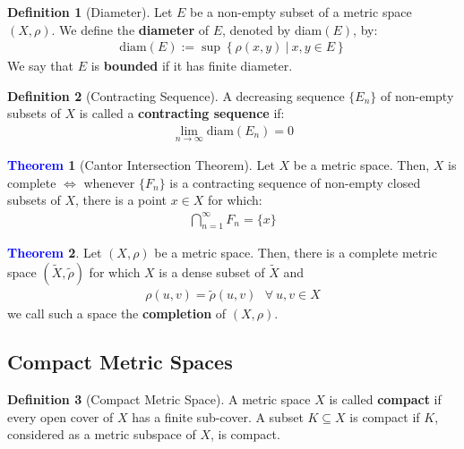 \documentclass[11pt]{article}
\theoremstyle{definition}
\theoremstyle{definition}
\newcommand{\sets}[2]{ \left\{ #1\ |\ #2 \right\}}
\newtheorem{theorem}{\textcolor{blue}{Theorem}}
\theoremstyle{definition}
\newtheorem{definition}{\textcolor{OliveGreen}{Definition}}
\theoremstyle{remark}
\begin{document}
\begin{definition}[Diameter]
	Let $E$ be a non-empty subset of a metric space $(X, \rho)$. We define the \textbf{diameter} of $E$, denoted by diam$(E)$, by: 
	\begin{align}
		\text{diam}(E):= \sup \sets{\rho(x,y)}{x, y \in E}
	\end{align}
	We say that $E$ is \textbf{bounded} if it has finite diameter. 
\end{definition}

\begin{definition}[Contracting Sequence]
	A decreasing sequence $\{ E_n \}$ of non-empty subsets of $X$ is called a \textbf{contracting sequence} if: 
	\begin{align}
		\lim_{n \rightarrow \infty} \text{diam}(E_n) = 0 
	\end{align}
\end{definition}

\begin{theorem}[Cantor Intersection Theorem]
	Let $X$ be a metric space. Then, $X$ is complete $\iff$ whenever $\{ F_n \}$ is a contracting sequence of non-empty closed subsets of $X$, there is a point $x \in X$ for which: 
	\begin{align}
		\bigcap_{n=1}^\infty F_n = \{ x \}
	\end{align}
\end{theorem}

\begin{theorem}
	Let $(X, \rho)$ be a metric space. Then, there is a complete metric space $(\widetilde{X}, \tilde{\rho})$ for which $X$ is a dense subset of $\widetilde{X}$ and 
	\begin{align}
		\rho(u,v) = \tilde{\rho}(u,v) \text{ 		} \forall\ u, v \in X
	\end{align}
	we call such a space the \textbf{completion} of $(X, \rho)$. 
\end{theorem}

\subsection{Compact Metric Spaces}

\begin{definition}[Compact Metric Space]
	A metric space $X$ is called \textbf{compact} if every open cover of $X$ has a finite sub-cover. A subset $K \subseteq X$ is compact if $K$, considered as a metric subspace of $X$, is compact. 
\end{definition}
\end{document}
